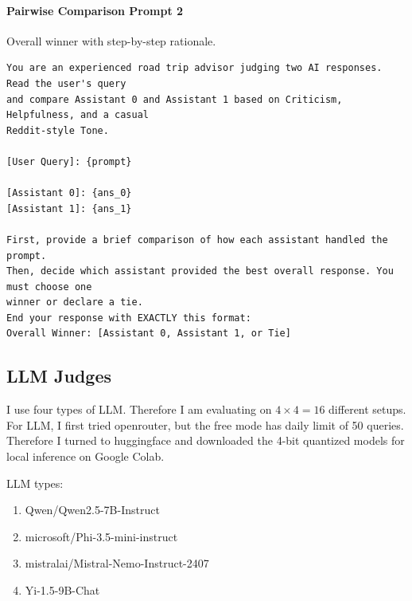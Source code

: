 \documentclass[12pt]{article}
\begin{document}
\paragraph{Pairwise Comparison Prompt 2}
Overall winner with step-by-step rationale.
\begin{verbatim}
You are an experienced road trip advisor judging two AI responses. Read the user's query 
and compare Assistant 0 and Assistant 1 based on Criticism, Helpfulness, and a casual 
Reddit-style Tone.

[User Query]: {prompt}

[Assistant 0]: {ans_0}
[Assistant 1]: {ans_1}

First, provide a brief comparison of how each assistant handled the prompt. 
Then, decide which assistant provided the best overall response. You must choose one 
winner or declare a tie. 
End your response with EXACTLY this format:
Overall Winner: [Assistant 0, Assistant 1, or Tie]
\end{verbatim}

\subsection{LLM Judges}
I use four types of LLM. Therefore I am evaluating on $4 \times 4 = 16$ different setups. For LLM, I first tried openrouter, but the free mode has daily limit of 50 queries. Therefore I turned to huggingface and downloaded the 4-bit quantized models for local inference on Google Colab.

LLM types:
\begin{enumerate}
    \item Qwen/Qwen2.5-7B-Instruct
    \item microsoft/Phi-3.5-mini-instruct
    \item mistralai/Mistral-Nemo-Instruct-2407
    \item Yi-1.5-9B-Chat
\end{enumerate}
\end{document}
